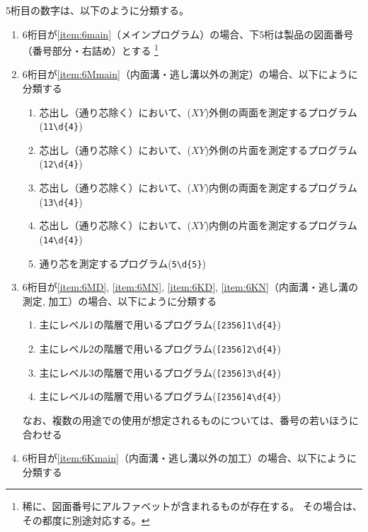 5桁目の数字は、以下のように分類する。
\begin{enumerate}[label=\alph*)]
\item 6桁目が\ref{item:6main}（メインプログラム）の場合、下5桁は製品の図面番号（番号部分・右詰め）とする
\footnote{稀に、図面番号にアルファベットが含まれるものが存在する。
その場合は、その都度に別途対応する。}
\item 6桁目が\ref{item:6Mmain}（内面溝・逃し溝以外の測定）の場合、以下にように分類する
  \begin{enumerate}[label=\arabic*., ref=\arabic*]
  \item\label{item:5MCOB} 芯出し（通り芯除く）において、($XY$)外側の両面を測定するプログラム(\verb|11\d{4}|)
  \item\label{item:5MCOO} 芯出し（通り芯除く）において、($XY$)外側の片面を測定するプログラム(\verb|12\d{4}|)
  \item\label{item:5MCIB} 芯出し（通り芯除く）において、($XY$)内側の両面を測定するプログラム(\verb|13\d{4}|)
  \item\label{item:5MCIO} 芯出し（通り芯除く）において、($XY$)内側の片面を測定するプログラム(\verb|14\d{4}|)
  \item\label{item:5MCL} 通り芯を測定するプログラム(\verb|5\d{5}|)
  \end{enumerate}
\item 6桁目が\ref{item:6MD}, \ref{item:6MN}, \ref{item:6KD}, \ref{item:6KN}（内面溝・逃し溝の測定, 加工）の場合、以下にように分類する
  \begin{enumerate}[label=\arabic*., ref=\arabic*]
  \item 主にレベル1の階層で用いるプログラム(\verb|[2356]1\d{4}|)
  \item 主にレベル2の階層で用いるプログラム(\verb|[2356]2\d{4}|)
  \item 主にレベル3の階層で用いるプログラム(\verb|[2356]3\d{4}|)
  \item 主にレベル4の階層で用いるプログラム(\verb|[2356]4\d{4}|)
  \end{enumerate}
  なお、複数の用途での使用が想定されるものについては、番号の若いほうに合わせる
\item 6桁目が\ref{item:6Kmain}（内面溝・逃し溝以外の加工）の場合、以下にように分類する
  \begin{enumerate}[label=\arabic*., ref=\arabic*]

\end{enumerate}
\end{enumerate}
